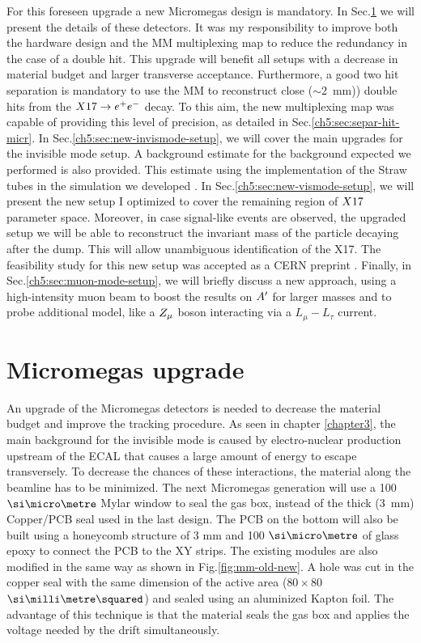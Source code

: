 For this foreseen upgrade a new Micromegas design is mandatory. In Sec.\ref{ch5:sec:mm-upgrades} we will present the details of these detectors. It was my responsibility to improve both the hardware design and the MM multiplexing map to reduce the redundancy in the case of a double hit. This upgrade will benefit all setups with a decrease in material budget and larger transverse acceptance. Furthermore, a good two hit separation is mandatory to use the MM to reconstruct close ($\sim$\SI{2}{mm})) double hits from the $X17 \to e^+e^-$ decay. To this aim, the new multiplexing map was capable of providing this level of precision, as detailed in Sec.\ref{ch5:sec:separ-hit-micr}.
In Sec.\ref{ch5:sec:new-invismode-setup}, we will cover the main upgrades for the invisible mode setup. A background estimate for the background expected we performed is also provided. This estimate using the implementation of the Straw tubes in the simulation we developed \cite{pdegen-thesis}. In Sec.\ref{ch5:sec:new-vismode-setup}, we will present the new setup I optimized to cover the remaining region of $X17$ parameter space. Moreover, in case signal-like events are observed, the upgraded setup we will be able to reconstruct the invariant mass of the particle decaying after the dump. This will allow unambiguous identification of the X17.
The feasibility study for this new setup was accepted as a CERN preprint \cite{Depero:2020zfy}. Finally, in Sec.\ref{ch5:sec:muon-mode-setup}, we will briefly discuss a new approach, using a high-intensity muon beam to boost the results on $A'$ for larger masses and to probe additional model, like a $Z_{\mu}$ boson interacting via a $L_{\mu} - L_{\tau}$ current.

\section{Micromegas upgrade}
\label{ch5:sec:mm-upgrades}

An upgrade of the Micromegas detectors is needed to decrease the material budget and improve the tracking procedure. As seen in chapter \ref{chapter3}, the main background for the invisible mode is caused by electro-nuclear production upstream of the ECAL that causes a large amount of energy to escape transversely. To decrease the chances of these interactions, the material along the beamline has to be minimized. The next Micromegas generation will use a 100 $\mum$ Mylar window to seal the gas box, instead of the thick (\SI{3}{mm})
Copper/PCB seal used in the last design. The PCB on the bottom will also be built using a honeycomb structure of 3 mm and 100 $\mum$ of glass epoxy to connect the PCB to the XY strips. The existing modules are also modified in the same way as shown in Fig.\ref{fig:mm-old-new}. A hole was cut in the copper seal with the same dimension of the active area ($80 \times 80$ $\mms$) and sealed using an aluminized Kapton foil. The advantage of this technique is that the material seals the gas box and applies the voltage needed by the drift simultaneously.

